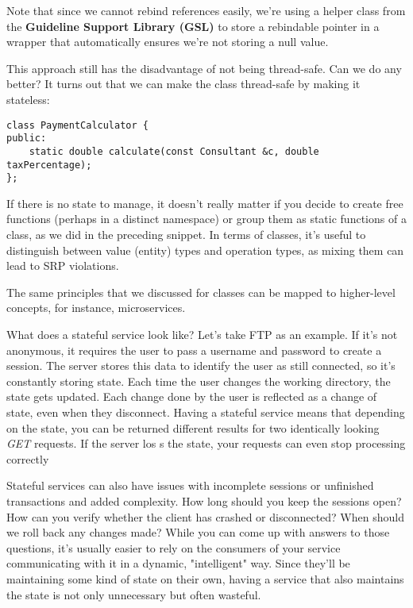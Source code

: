 Note that since we cannot rebind references easily, we're using a helper class from the \textbf{Guideline Support Library (GSL)} to store a rebindable pointer in a wrapper that automatically ensures we're not storing a null value.

This approach still has the disadvantage of not being thread-safe. Can we do any better? It turns out that we can make the class thread-safe by making it stateless:


\begin{lstlisting}[style=styleCXX]
class PaymentCalculator {
public:
	static double calculate(const Consultant &c, double taxPercentage);
};
\end{lstlisting}

If there is no state to manage, it doesn't really matter if you decide to create free functions (perhaps in a distinct namespace) or group them as static functions of a class, as we did in the preceding snippet. In terms of classes, it's useful to distinguish between value (entity) types and operation types, as mixing them can lead to SRP violations.



The same principles that we discussed for classes can be mapped to higher-level concepts, for instance, microservices.

What does a stateful service look like? Let's take FTP as an example. If it's not anonymous, it requires the user to pass a username and password to create a session. The server stores this data to identify the user as still connected, so it's constantly storing state. Each time the user changes the working directory, the state gets updated. Each change done by the user is reflected as a change of state, even when they disconnect. Having a stateful service means that depending on the state, you can be returned different results for two identically looking \textit{GET} requests. If the server los s the state, your requests can even stop processing correctly

Stateful services can also have issues with incomplete sessions or unfinished transactions and added complexity. How long should you keep the sessions open? How can you verify whether the client has crashed or disconnected? When should we roll back any changes made? While you can come up with answers to those questions, it's usually easier to rely on the consumers of your service communicating with it in a dynamic, "intelligent" way. Since they'll be maintaining some kind of state on their own, having a service that also maintains the state is not only unnecessary but often wasteful.

